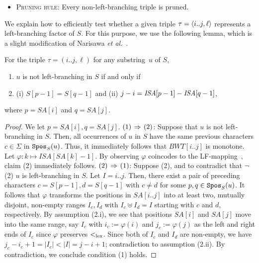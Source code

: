 \documentclass{article}
\begin{document}
\begin{itemize}\item[]
\quad\textsc{Pruning rule}: {Every non-left-branching triple is pruned.}
\end{itemize}

We explain how to efficiently test whether a given triple $\tau = \langle i..j, \ell\rangle$ represents a left-branching factor of $S$. For this purpose, we use the following lemma, which is a slight modification of Narisawa \textit{et al.}~\cite[Lemma~10]{narisawa2007efficient}.

\begin{minipage}{\textwidth}
\begin{lemmarep}\label{lem:leftmaximal:character}
  For the triple $\tau = (i..j, \ell)$ for any substring~$u$ of $S$,
  \begin{enumerate}[(1)]
\item $u$ is not left-branching in $S$ if and only if  
\item (i) $S[p-1] = S[q-1]$ and (ii) $j - i = \mathit{ISA}[p-1] - \mathit{ISA}[q-1]$, 
\end{enumerate}
where $p = SA[i]$ and $q = SA[j]$.
\end{lemmarep}
\end{minipage}
\medskip 

\begin{proof}
We let $p = SA[i], q = SA[j]$. 
$(1)\mathbin{\,\Rightarrow\,} (2)$: Suppose that $u$ is not left-branching in $S$.
Then, all occurrences of $u$ in $S$ have the same previous characters $c \in \Sigma$ in $\mathtt{Spos}_{S}(u)$. Thus, it immediately follows that $BWT[i..j]$ is monotone.
Let $\varphi: k \mapsto ISA[SA[k]-1]$. By observing $\varphi$ coincodes to the LF-mapping~\cite{Ferragina05:FM}, claim (2) immediately follows. 
$(2) \mathbin{\,\Rightarrow\,} (1)$: 
Suppose (2), and to contradict that $\neg$(2) $u$ is left-branching in $S$. Let $I = i..j$. Then, there exist a pair of preceding characters $c = S[p-1], d=S[q-1]$ with $c\not= d$ for some $p, q \in \mathtt{Spos}_{S}(u)$. It follows that $\varphi$ transforms the positions in  $SA[i..j]$ into at least two, mutually disjoint, non-empty ranges $I_c, I_d$ with $I_c\uplus I_d = I$ starting with $c$ and $d$, respectively. By assumption (2.i), we see that positions $SA[i]$ and $SA[j]$ move into the same range, say $I_c$ with $i_c := \varphi(i)$ and $j_c := \varphi(j)$ as the left and right ends of $I_c$ since $\varphi$ preserves $<_{\mathrm{lex}}$. 
Since both of $I_c$ and $I_d$ are non-empty, we have $j_c - i_c + 1 = |I_c| < |I| = j - i + 1$; contradiction to assumption (2.ii). By contradiction, we conclude condition (1) holds. 
\end{proof}
\end{document}
